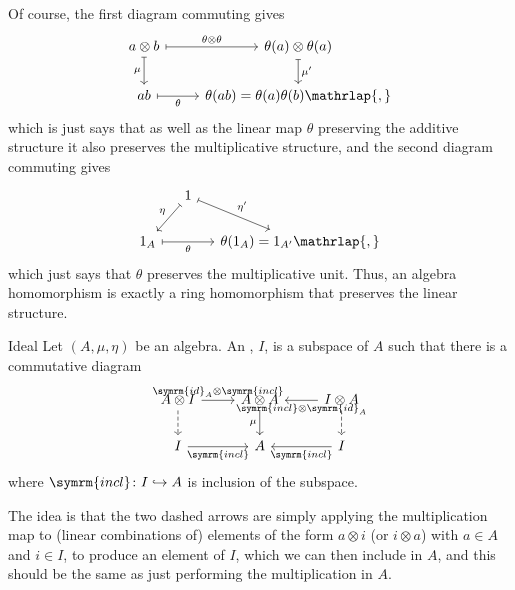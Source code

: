 \documentclass[fleqn]{NotesClass}
\newcommand{\id}{\symrm{id}}
\newcommand{\incl}{\symrm{incl}}
\begin{document}
    Of course, the first diagram commuting gives
    \begin{equation}
        \begin{tikzcd}
            a \otimes b \arrow[r, mapsto, "\theta \otimes \theta"] \arrow[d, mapsto, "\mu"'] & \theta(a) \otimes \theta(a) \arrow[d, mapsto, "\mu'"]\\
            ab \arrow[r, mapsto, "\theta"'] & \theta(ab) = \theta(a)\theta(b)\mathrlap{,}
        \end{tikzcd}
    \end{equation}
    which is just says that as well as the linear map \(\theta\) preserving the additive structure it also preserves the multiplicative structure, and the second diagram commuting gives
    \begin{equation}
        \begin{tikzcd}[column sep=small]
            & 1 \arrow[dl, mapsto, "\eta"'] \arrow[dr, mapsto, "\eta'"]\\
            1_A \arrow[rr, mapsto, "\theta"'] && \theta(1_A) = 1_{A'} \mathrlap{,}
        \end{tikzcd}
    \end{equation}
    which just says that \(\theta\) preserves the multiplicative unit.
    Thus, an algebra homomorphism is exactly a ring homomorphism that preserves the linear structure.
    
    \begin{dfn}{Ideal}{}
        Let \((A, \mu, \eta)\) be an algebra.
        An , \(I\), is a subspace of \(A\) such that there is a commutative diagram
        \begin{equation}
            \begin{tikzcd}
                A \otimes I \arrow[r, "\id_A \otimes \incl"] \arrow[d, dashed] & A \otimes A \arrow[d, "\mu"'] & I \otimes A \arrow[l, "\incl \otimes \id_A"] \arrow[d, dashed]\\
                I \arrow[r, "\incl"'] & A & I \arrow[l, "\incl"]
            \end{tikzcd}
        \end{equation}
        where \(\incl \colon I \hookrightarrow A\) is inclusion of the subspace.
    \end{dfn}
    
    The idea is that the two dashed arrows are simply applying the multiplication map to (linear combinations of) elements of the form \(a \otimes i\) (or \(i \otimes a\)) with \(a \in A\) and \(i \in I\), to produce an element of \(I\), which we can then include in \(A\), and this should be the same as just performing the multiplication in \(A\).
    
\end{document}
